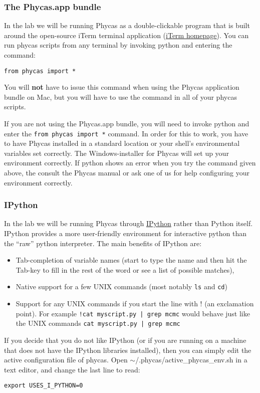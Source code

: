 \documentclass{article}
\newcommand{\cmd}[1]{\texttt{#1}\xspace}
\newcommand{\phycas}{Phycas\xspace}
\newcommand{\localfile}[1]{\textsf{#1}\xspace}
\begin{document}
\subsubsection{The Phycas.app bundle}
In the lab we will be running \phycas as a double-clickable program that is built around the open-source iTerm terminal application (\href{http://iterm.sourceforge.net/}{iTerm homepage}).
You can run phycas scripts from any terminal by invoking python and entering the command:
\begin{verbatim}
from phycas import *
\end{verbatim}
You will {\bf not} have to issue this command when using the \phycas application bundle on Mac, but you will have to use the command in all of your phycas scripts.

If you are not using the Phycas.app bundle, you will need to invoke python and enter the \cmd{from phycas import *} command.
In order for this to work, you have to have \phycas installed in a standard location or your shell's environmental variables set correctly.
The Windows-installer for \phycas will set up your environment correctly.
If python shows an error when you try the command given above, the consult the \phycas manual or ask one
of us for help configuring your environment correctly.

\subsubsection{IPython}
In the lab we will be running \phycas through \href{http://ipython.scipy.org/moin/}{IPython} rather than Python itself.  
IPython provides a more user-friendly environment for interactive python than the ``raw'' python interpreter.
The main benefits of IPython are:
\begin{itemize}
	\item Tab-completion of variable names (start to type the name and then hit the Tab-key to fill in the rest of the word or see a list of possible matches),
	\item Native support for a few UNIX commands (most notably \cmd{ls} and \cmd{cd})
	\item Support for any UNIX commands if you start the line with ! (an exclamation point). For example \cmd{!cat myscript.py | grep mcmc} would behave just like the UNIX commands \cmd{cat myscript.py | grep mcmc}
\end{itemize}
If you decide that you do not like IPython (or if you are running on a machine that does not have the IPython libraries installed), then you can simply edit the active configuration file of phycas. 
Open 
\localfile{$\sim$/.phycas/active\_phycas\_env.sh} 
in a text editor, and change the last line to read:
\begin{verbatim}
export USES_I_PYTHON=0
\end{verbatim}
\end{document}
